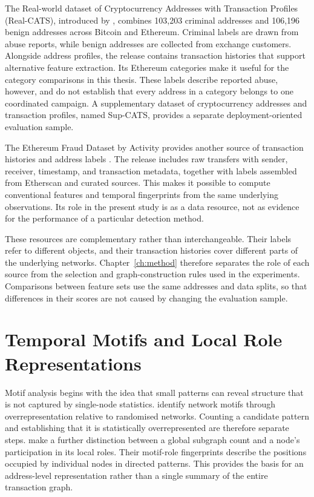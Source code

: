 The Real-world dataset of Cryptocurrency Addresses with Transaction Profiles
(Real-CATS), introduced by \citet{shi2025realcats}, combines 103,203 criminal
addresses and 106,196 benign addresses across Bitcoin and Ethereum. Criminal
labels are drawn from abuse reports, while benign addresses are collected from
exchange customers. Alongside address profiles, the release contains
transaction histories that support alternative feature extraction. Its
Ethereum categories make it useful for the category comparisons in this
thesis. These labels describe reported abuse, however, and do not establish
that every address in a category belongs to one coordinated campaign.
A supplementary dataset of cryptocurrency addresses and transaction profiles,
named Sup-CATS, provides a separate deployment-oriented evaluation sample.

The Ethereum Fraud Dataset by Activity provides another source of transaction
histories and address labels \citep{fesevu2025ethfraud}. The release includes raw
transfers with sender, receiver, timestamp, and transaction metadata, together
with labels assembled from Etherscan and curated sources. This makes it
possible to compute conventional features and temporal fingerprints from the
same underlying observations. Its role in the present study is as a data
resource, not as evidence for the performance of a particular detection method.

These resources are complementary rather than interchangeable. Their labels
refer to different objects, and their transaction histories cover different
parts of the underlying networks. Chapter~\ref{ch:method} therefore separates
the role of each source from the selection and graph-construction rules used
in the experiments. Comparisons between feature sets use the same addresses
and data splits, so that differences in their scores are not caused by changing
the evaluation sample.

\section{Temporal Motifs and Local Role Representations}
\label{sec:related_temporal_motifs}

Motif analysis begins with the idea that small patterns can reveal structure
that is not captured by single-node statistics.
\citet{milo2002network} identify network motifs through overrepresentation
relative to randomised networks. Counting a candidate pattern and establishing
that it is statistically overrepresented are therefore separate steps.
\citet{McDonnell2014} make a further distinction between a global subgraph
count and a node's participation in its local roles. Their motif-role
fingerprints describe the positions occupied by individual nodes in directed
patterns. This provides the basis for an address-level representation rather
than a single summary of the entire transaction graph.

